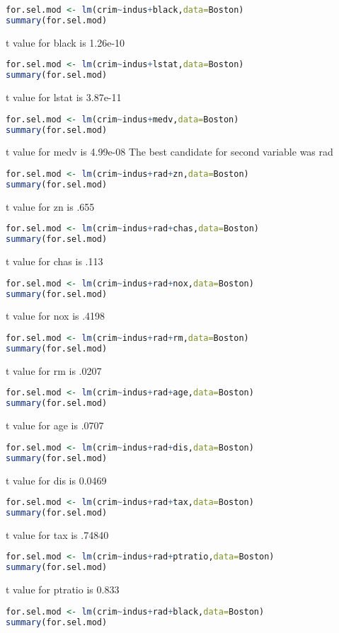 \documentclass[11pt]{report}
\begin{document}
\begin{itemize}
\begin{lstlisting}[language=R]
for.sel.mod <- lm(crim~indus+black,data=Boston)
summary(for.sel.mod)
\end{lstlisting}
t value for black is 1.26e-10
\begin{lstlisting}[language=R]
for.sel.mod <- lm(crim~indus+lstat,data=Boston)
summary(for.sel.mod)
\end{lstlisting}
t value for lstat is 3.87e-11
\begin{lstlisting}[language=R]
for.sel.mod <- lm(crim~indus+medv,data=Boston)
summary(for.sel.mod)
\end{lstlisting}
t value for medv is 4.99e-08
The best candidate for second variable was rad
\begin{lstlisting}[language=R]
for.sel.mod <- lm(crim~indus+rad+zn,data=Boston)
summary(for.sel.mod)
\end{lstlisting}
t value for zn is .655
\begin{lstlisting}[language=R]
for.sel.mod <- lm(crim~indus+rad+chas,data=Boston)
summary(for.sel.mod)
\end{lstlisting}
t value for chas is .113
\begin{lstlisting}[language=R]
for.sel.mod <- lm(crim~indus+rad+nox,data=Boston)
summary(for.sel.mod)
\end{lstlisting}
t value for nox is .4198
\begin{lstlisting}[language=R]
for.sel.mod <- lm(crim~indus+rad+rm,data=Boston)
summary(for.sel.mod)
\end{lstlisting}
t value for rm is .0207
\begin{lstlisting}[language=R]
for.sel.mod <- lm(crim~indus+rad+age,data=Boston)
summary(for.sel.mod)
\end{lstlisting}
t value for age is .0707
\begin{lstlisting}[language=R]
for.sel.mod <- lm(crim~indus+rad+dis,data=Boston)
summary(for.sel.mod)
\end{lstlisting}
t value for dis is 0.0469
\begin{lstlisting}[language=R]
for.sel.mod <- lm(crim~indus+rad+tax,data=Boston)
summary(for.sel.mod)
\end{lstlisting}
t value for tax is .74840
\begin{lstlisting}[language=R]
for.sel.mod <- lm(crim~indus+rad+ptratio,data=Boston)
summary(for.sel.mod)
\end{lstlisting}
t value for ptratio is 0.833
\begin{lstlisting}[language=R]
for.sel.mod <- lm(crim~indus+rad+black,data=Boston)
summary(for.sel.mod)
\end{lstlisting}

\end{itemize}
\end{document}
